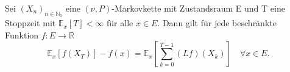\label{Dynkin-Formel}
Sei $(X_{n})_{n \in \mathbb{N}_{0}}$ eine $(\nu,P)$-Markovkette mit Zustandsraum E und T eine Stoppzeit mit $\mathbb{E}_{x}[T]< \infty$ für alle $x \in E$. Dann gilt für jede beschränkte Funktion $f: E \to \mathbb{R}$
\begin{equation*}
\mathbb{E}_{x}[f(X_{T})] - f(x) = \mathbb{E}_{x}[\sum_{k=0}^{T-1}(Lf)(X_{k})] \quad \forall x \in E.
\end{equation*}
